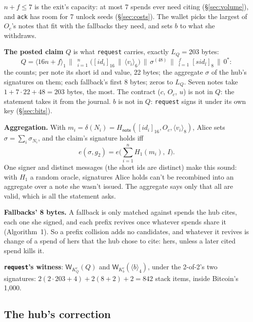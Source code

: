 \documentclass[11pt]{article}
\theoremstyle{plain}
\theoremstyle{definition}
\newcommand{\tx}[1]{\texttt{#1}}
\newcommand{\be}[2]{\langle #1\rangle_{#2}}
\newcommand{\pre}[2]{[#1]_{#2}}
\newcommand{\Ht}[1]{H_{\textsf{#1}}}
\newcommand{\Wots}{\mathsf{W}}
\newcommand{\sid}{\mathit{sid}}
\newcommand{\Oc}{O_c}
\newcommand{\KQ}{K_{Q}^{c}}
\newcommand{\Kb}{K_{b}^{c}}
\newcommand{\Hg}{H_{1}}
\begin{document}
$n + f \le 7$ is the exit's capacity: at most 7 spends ever need citing
(\S\ref{sec:volume}), and \tx{ack} has room for 7 unlock seeds
(\S\ref{sec:costs}). The wallet picks the largest of $\Oc$'s notes that
fit with the fallbacks they need, and sets $b$ to what she withdraws.

\textbf{The posted claim} $Q$ is what \tx{request} carries, exactly
$L_Q = 203$ bytes:
\[
  Q = \be{16n + f}{1} \,\big\|\, \mathop{\big\|}_{i=1}^{n}
  \big(\pre{\mathit{id}_i}{16} \,\|\, \be{v_i}{6}\big)
  \,\big\|\, \sigma^{(48)} \,\big\|\, \mathop{\big\|}_{l=1}^{f} \pre{\sid_l}{8}
  \,\big\|\, 0^{\ast}:
\]
the counts; per note its short id and value, 22 bytes; the aggregate
$\sigma$ of the hub's signatures on them; each fallback's first 8
bytes; zeros to $L_Q$. Seven notes take $1 + 7 \cdot 22 + 48 = 203$
bytes, the most. The contract ($c$, $\Oc$, $u$) is not in
$Q$: the statement takes it from the journal. $b$ is not in $Q$:
\tx{request} signs it under its own key (\S\ref{sec:bits}).

\textbf{Aggregation.} With $m_i = \delta(N_i) =
\Ht{note}(\pre{\mathit{id}_i}{16}, \Oc, \be{v_i}{8})$, Alice sets $\sigma
= \sum_i \sigma_{N_i}$, and the claim's signature holds iff
\[
  e(\sigma, g_2) = e\Big(\sum_{i=1}^{n} \Hg(m_i),\ I\Big).
\]
One signer and distinct messages (the short ids are distinct) make this
sound: with $\Hg$ a random oracle, signatures Alice holds can't be
recombined into an aggregate over a note she wasn't issued. The
aggregate says only that all are valid, which is all the statement
asks.

\textbf{Fallbacks' 8 bytes.} A fallback is only matched against spends
the hub cites, each one she signed, and each prefix revives once
whatever spends share it (Algorithm~1). So a prefix collision adds no
candidates, and whatever it revives is change of a spend of hers that
the hub chose to cite: hers, unless a later cited spend kills it.

\textbf{\tx{request}'s witness}: $\Wots_{\KQ}(Q)$ and
$\Wots_{\Kb}(\be{b}{4})$, under the 2-of-2's two signatures: $2(2 \cdot
203 + 4) + 2(8 + 2) + 2 = 842$ stack items, inside Bitcoin's 1,000.

\subsection{The hub's correction}\label{sec:correct}
\end{document}
